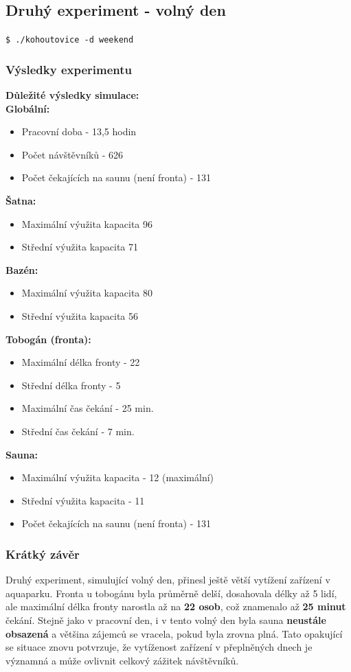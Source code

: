 \documentclass[a4paper, 11pt]{article}
\begin{document}
    \subsection {Druhý experiment - volný den}
    \verb|$ ./kohoutovice -d weekend| 
    \subsubsection{Výsledky experimentu}
    \textbf{Důležité výsledky simulace:}\\
    \textbf{Globální:}
    \begin{itemize}
    \item Pracovní doba - 13,5 hodin
    \item Počet návštěvníků - 626
    \item Počet čekajících na saunu (není fronta) - 131
    \end{itemize}
    \textbf{Šatna:}
    \begin{itemize}
    \item Maximální výužita kapacita 96
    \item Střední výužita kapacita 71
    \end{itemize}
    \textbf{Bazén:}
    \begin{itemize}
    \item Maximální výužita kapacita 80
    \item Střední výužita kapacita 56
    \end{itemize}
    \textbf{Tobogán (fronta):}
    \begin{itemize}
    \item Maximální délka fronty - 22
    \item Střední délka fronty - 5
    \item Maximální čas čekání - 25 min.
    \item Střední čas čekání - 7 min.
    \end{itemize}
    \textbf{Sauna:}
    \begin{itemize}
    \item Maximální výužita kapacita - 12 (maximální)
    \item Střední výužita kapacita - 11
    \item Počet čekajících na saunu (není fronta) - 131
    \end{itemize}
    \subsubsection{Krátký závěr}
    Druhý experiment, simulující volný den, přinesl ještě větší vytížení zařízení v aquaparku. Fronta u tobogánu byla průměrně delší, dosahovala délky až 5 lidí, ale maximální délka fronty narostla až na \textbf{22 osob}, což znamenalo až \textbf{25 minut} čekání. Stejně jako v pracovní den, i v tento volný den byla sauna \textbf{neustále obsazená} a většina zájemců se vracela, pokud byla zrovna plná. Tato opakující se situace znovu potvrzuje, že vytíženost zařízení v přeplněných dnech je významná a může ovlivnit celkový zážitek návštěvníků. 
\end{document}
